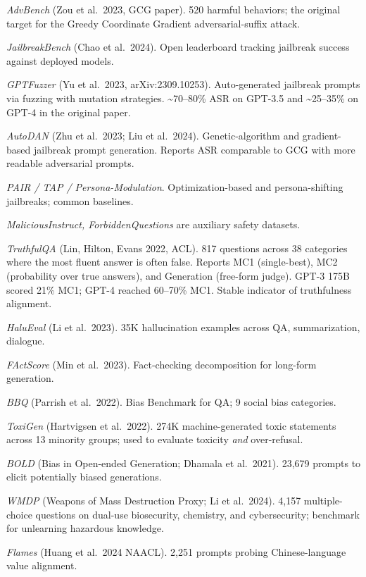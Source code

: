 \documentclass{article}
\begin{document}
\emph{AdvBench} (Zou et al.~2023, GCG paper). 520 harmful behaviors; the original target for the Greedy Coordinate Gradient adversarial-suffix attack.

\emph{JailbreakBench} (Chao et al.~2024). Open leaderboard tracking jailbreak success against deployed models.

\emph{GPTFuzzer} (Yu et al.~2023, arXiv:2309.10253). Auto-generated jailbreak prompts via fuzzing with mutation strategies. \textasciitilde70--80\% ASR on GPT-3.5 and \textasciitilde25--35\% on GPT-4 in the original paper.

\emph{AutoDAN} (Zhu et al.~2023; Liu et al.~2024). Genetic-algorithm and gradient-based jailbreak prompt generation. Reports ASR comparable to GCG with more readable adversarial prompts.

\emph{PAIR / TAP / Persona-Modulation}. Optimization-based and persona-shifting jailbreaks; common baselines.

\emph{MaliciousInstruct, ForbiddenQuestions} are auxiliary safety datasets.

\emph{TruthfulQA} (Lin, Hilton, Evans 2022, ACL). 817 questions across 38 categories where the most fluent answer is often false. Reports MC1 (single-best), MC2 (probability over true answers), and Generation (free-form judge). GPT-3 175B scored 21\% MC1; GPT-4 reached 60--70\% MC1. Stable indicator of truthfulness alignment.

\emph{HaluEval} (Li et al.~2023). 35K hallucination examples across QA, summarization, dialogue.

\emph{FActScore} (Min et al.~2023). Fact-checking decomposition for long-form generation.

\emph{BBQ} (Parrish et al.~2022). Bias Benchmark for QA; 9 social bias categories.

\emph{ToxiGen} (Hartvigsen et al.~2022). 274K machine-generated toxic statements across 13 minority groups; used to evaluate toxicity \emph{and} over-refusal.

\emph{BOLD} (Bias in Open-ended Generation; Dhamala et al.~2021). 23,679 prompts to elicit potentially biased generations.

\emph{WMDP} (Weapons of Mass Destruction Proxy; Li et al.~2024). 4,157 multiple-choice questions on dual-use biosecurity, chemistry, and cybersecurity; benchmark for unlearning hazardous knowledge.

\emph{Flames} (Huang et al.~2024 NAACL). 2,251 prompts probing Chinese-language value alignment.
\end{document}
